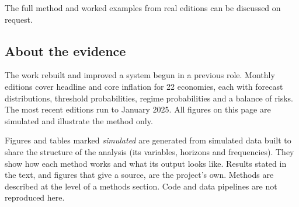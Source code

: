 \documentclass[
  british,
  a4paper,
]{article}
\begin{document}
The full method and worked examples from real editions can be discussed
on request.

\subsection{About the evidence}\label{about-the-evidence}

The work rebuilt and improved a system begun in a previous role. Monthly
editions cover headline and core inflation for 22 economies, each with
forecast distributions, threshold probabilities, regime probabilities
and a balance of risks. The most recent editions run to January 2025.
All figures on this page are simulated and illustrate the method only.

Figures and tables marked \emph{simulated} are generated from simulated
data built to share the structure of the analysis (its variables,
horizons and frequencies). They show how each method works and what its
output looks like. Results stated in the text, and figures that give a
source, are the project's own. Methods are described at the level of a
methods section. Code and data pipelines are not reproduced here.
\end{document}
